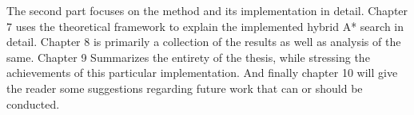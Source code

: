 The second part focuses on the method and its implementation in detail. Chapter 7 uses the theoretical framework to explain the implemented hybrid A* search in detail. Chapter 8 is primarily a collection of the results as well as analysis of the same. Chapter 9 Summarizes the entirety of the thesis, while stressing the achievements of this particular implementation. And finally chapter 10 will give the reader some suggestions regarding future work that can or should be conducted.